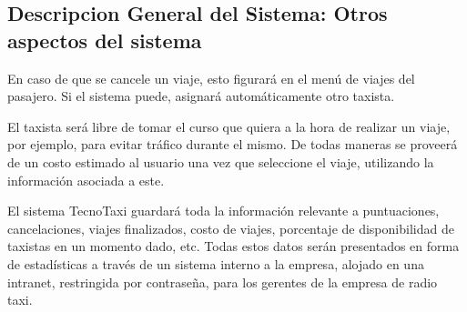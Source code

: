 	\subsection{Descripcion General del Sistema: Otros aspectos del sistema}
	En caso de que se cancele un viaje, esto figurará en el menú de viajes del pasajero. Si el sistema puede, asignará automáticamente otro taxista.

	El taxista será libre de tomar el curso que quiera a la hora de realizar un viaje, por ejemplo, para evitar tráfico durante el mismo. De todas maneras se proveerá de un costo estimado al usuario una vez que seleccione el viaje, utilizando la información asociada a este.

	El sistema TecnoTaxi guardará toda la información relevante a puntuaciones, cancelaciones, viajes finalizados, costo de viajes, porcentaje de disponibilidad de taxistas en un momento dado, etc. Todas estos datos serán presentados en forma de estadísticas a través de un sistema interno a la empresa, alojado en una intranet, restringida por contraseña, para los gerentes de la empresa de radio taxi.